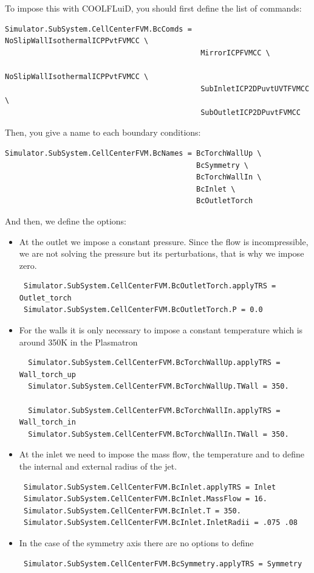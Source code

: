 \documentclass[11pt]{article}
\begin{document}
To impose this with COOLFLuiD, you should first define the list of commands:
\begin{verbatim}
Simulator.SubSystem.CellCenterFVM.BcComds = NoSlipWallIsothermalICPPvtFVMCC \
                                             MirrorICPFVMCC \
                                             NoSlipWallIsothermalICPPvtFVMCC \
                                             SubInletICP2DPuvtUVTFVMCC \
                                             SubOutletICP2DPuvtFVMCC 
\end{verbatim} 
Then, you give a name to each boundary conditions:
\begin{verbatim}
Simulator.SubSystem.CellCenterFVM.BcNames = BcTorchWallUp \
                                            BcSymmetry \
                                            BcTorchWallIn \
                                            BcInlet \
                                            BcOutletTorch
\end{verbatim}

And then, we define the options:
\begin{itemize}
 \item At the outlet we impose a constant pressure. Since the flow is incompressible,
we are not solving the pressure but its perturbations, that is why we impose zero.
\begin{verbatim}
 Simulator.SubSystem.CellCenterFVM.BcOutletTorch.applyTRS = Outlet_torch
 Simulator.SubSystem.CellCenterFVM.BcOutletTorch.P = 0.0
\end{verbatim}
\item For the walls it is only necessary to impose a constant temperature which is around 350K in the Plasmatron
\begin{verbatim}
  Simulator.SubSystem.CellCenterFVM.BcTorchWallUp.applyTRS = Wall_torch_up
  Simulator.SubSystem.CellCenterFVM.BcTorchWallUp.TWall = 350.

  Simulator.SubSystem.CellCenterFVM.BcTorchWallIn.applyTRS = Wall_torch_in
  Simulator.SubSystem.CellCenterFVM.BcTorchWallIn.TWall = 350.
\end{verbatim}
\item At the inlet we need to impose the mass flow, the temperature and to define
the internal and external radius of the jet.
\begin{verbatim}
 Simulator.SubSystem.CellCenterFVM.BcInlet.applyTRS = Inlet
 Simulator.SubSystem.CellCenterFVM.BcInlet.MassFlow = 16.
 Simulator.SubSystem.CellCenterFVM.BcInlet.T = 350.
 Simulator.SubSystem.CellCenterFVM.BcInlet.InletRadii = .075 .08
\end{verbatim}
\item In the case of the symmetry axis there are no options to define
\begin{verbatim}
 Simulator.SubSystem.CellCenterFVM.BcSymmetry.applyTRS = Symmetry
\end{verbatim}
\end{itemize}
\end{document}
